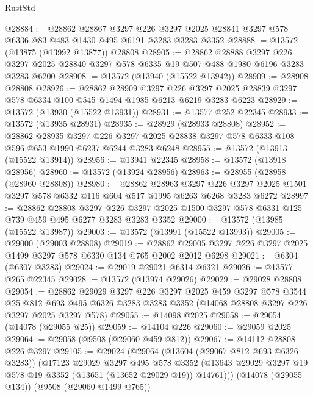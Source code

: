 \begin{lexlean}{RustStd}
\begin{coremodule}
@28884 := @28862
    @28867
    @3297
    @226
    @3297
    @2025
    @28841
    @3297
    @578
    @6336
    @83
    @483
    @1430
    @495
    @6191
    @3283
    @3283
    @3352
@28888 := @13572 (@13875 (@13992 @13877)) @28808
@28905 := @28862
    @28888
    @3297
    @226
    @3297
    @2025
    @28840
    @3297
    @578
    @6335
    @19
    @507
    @488
    @1980
    @6196
    @3283
    @3283
    @6200
@28908 := @13572 (@13940 (@15522 @13942))
@28909 := @28908 @28808
@28926 := @28862
    @28909
    @3297
    @226
    @3297
    @2025
    @28839
    @3297
    @578
    @6334
    @100
    @545
    @1494
    @1985
    @6213
    @6219
    @3283
    @6223
@28929 := @13572 (@13930 (@15522 @13931))
@28931 := @13577 @252 @22345
@28933 := @13572 (@13935 @28931)
@28935 := @28929 (@28933 @28808)
@28952 := @28862
    @28935
    @3297
    @226
    @3297
    @2025
    @28838
    @3297
    @578
    @6333
    @108
    @596
    @653
    @1990
    @6237
    @6244
    @3283
    @6248
@28955 := @13572 (@13913 (@15522 @13914))
@28956 := @13941 @22345
@28958 := @13572 (@13918 @28956)
@28960 := @13572 (@13924 @28956)
@28963 := @28955 (@28958 (@28960 @28808))
@28980 := @28862
    @28963
    @3297
    @226
    @3297
    @2025
    @1501
    @3297
    @578
    @6332
    @116
    @604
    @517
    @1995
    @6263
    @6268
    @3283
    @6272
@28997 := @28862
    @28808
    @3297
    @226
    @3297
    @2025
    @1500
    @3297
    @578
    @6331
    @125
    @739
    @459
    @495
    @6277
    @3283
    @3283
    @3352
@29000 := @13572 (@13985 (@15522 @13987))
@29003 := @13572 (@13991 (@15522 @13993))
@29005 := @29000 (@29003 @28808)
@29019 := @28862 @29005 @3297 @226 @3297 @2025 @1499 @3297 @578 @6330 @134 @765 @2002 @2012 @6298
@29021 := @6304 (@6307 @3283)
@29024 := @29019 @29021 @6314 @6321
@29026 := @13577 @265 @22345
@29028 := @13572 (@13974 @29026)
@29029 := @29028 @28808
@29054 := @28862
    @29029
    @3297
    @226
    @3297
    @2025
    @459
    @3297
    @578
    @3544
    @25
    @812
    @693
    @495
    @6326
    @3283
    @3283
    @3352
    (@14068 @28808 @3297 @226 @3297 @2025 @3297 @578)
@29055 := @14098 @2025
@29058 := @29054 (@14078 (@29055 @25))
@29059 := @14104 @226
@29060 := @29059 @2025
@29064 := @29058 (@9508 (@29060 @459 @812))
@29067 := @14112 @28808 @226 @3297
@29105 := @29024
    (@29064
      (@13604 (@29067 @812 @693 @6326 @3283))
      (@17123
        @29029
        @3297
        @495
        @578
        @3352
        (@13643 @29029 @3297 @19 @578 @19 @3352 (@13651 (@13652 @29029 @19)) @14761)))
    (@14078 (@29055 @134))
    (@9508 (@29060 @1499 @765))

\end{coremodule}
\end{lexlean}
